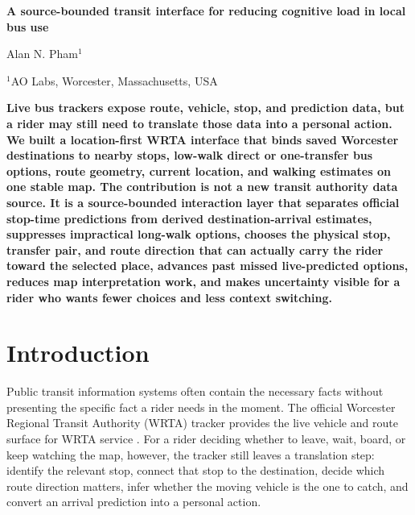 \documentclass[12pt,letterpaper]{article}
\begin{document}
\linenumbers
\thispagestyle{empty}

\begin{center}
    \vspace*{-0.6em}

    {\fontsize{20}{22}\selectfont\bfseries\color{SumiInk}
    A source-bounded transit interface for reducing cognitive load in local bus use\par}

    \vspace{0.95em}

    {\normalsize\color{SumiInk}
    Alan N. Pham$^{1}$\par}

    \vspace{0.38em}

    {\small\color{DustyTaupe}
    $^{1}$AO Labs, Worcester, Massachusetts, USA\par}
\end{center}

\vspace{0.35em}
\noindent\textbf{Live bus trackers expose route, vehicle, stop, and prediction data, but a rider may still need to translate those data into a personal action. We built a location-first WRTA interface that binds saved Worcester destinations to nearby stops, low-walk direct or one-transfer bus options, route geometry, current location, and walking estimates on one stable map. The contribution is not a new transit authority data source. It is a source-bounded interaction layer that separates official stop-time predictions from derived destination-arrival estimates, suppresses impractical long-walk options, chooses the physical stop, transfer pair, and route direction that can actually carry the rider toward the selected place, advances past missed live-predicted options, reduces map interpretation work, and makes uncertainty visible for a rider who wants fewer choices and less context switching.}

\newpage
\pagestyle{fancy}

\section{Introduction}

Public transit information systems often contain the necessary facts without presenting the specific fact a rider needs in the moment. The official Worcester Regional Transit Authority (WRTA) tracker provides the live vehicle and route surface for WRTA service \cite{wrtaTracker,wrtaHome}. For a rider deciding whether to leave, wait, board, or keep watching the map, however, the tracker still leaves a translation step: identify the relevant stop, connect that stop to the destination, decide which route direction matters, infer whether the moving vehicle is the one to catch, and convert an arrival prediction into a personal action.
\end{document}
